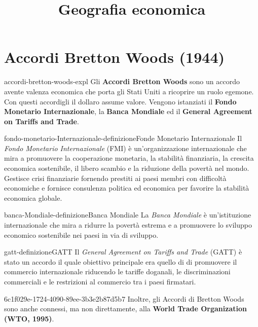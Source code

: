\documentclass[preview]{standalone}
\begin{document}
\title{Geografia economica}
\genpage

\section{Accordi Bretton Woods (1944)}

\begin{snippet}{accordi-bretton-woods-expl}
    Gli \textbf{Accordi Bretton Woods} sono un accordo avente valenza economica
    che porta gli Stati Uniti a ricoprire un ruolo egemone. Con questi accordigli il
    dollaro assume valore. Vengono istanziati il \textbf{Fondo Monetario Internazionale},
    la \textbf{Banca Mondiale} ed il \textbf{General Agreement on Tariffs and Trade}.
\end{snippet}

\begin{snippetdefinition}{fondo-monetario-Internazionale-definizione}{Fonde Monetario Internazionale}
    Il \textit{Fondo Monetario Internazionale} (FMI) è un'organizzazione internazionale che mira a promuovere
    la cooperazione monetaria, la stabilità finanziaria,
    la crescita economica sostenibile, il libero scambio e la riduzione della povertà nel mondo.
    Gestisce crisi finanziarie fornendo prestiti ai paesi membri con difficoltà economiche e
    fornisce consulenza politica ed economica per favorire la stabilità economica globale.
\end{snippetdefinition}

\begin{snippetdefinition}{banca-Mondiale-definizione}{Banca Mondiale}
    La \textit{Banca Mondiale} è un'istituzione internazionale che mira a ridurre la povertà
    estrema e a promuovere lo sviluppo economico sostenibile nei paesi in via di sviluppo.
\end{snippetdefinition}

\begin{snippetdefinition}{gatt-definizione}{GATT}
    Il \textit{General Agreement on Tariffs and Trade} (GATT)
    è stato un accordo il quale obiettivo principale era quello di
    di promuovere il commercio internazionale riducendo le tariffe doganali,
    le discriminazioni commerciali e le restrizioni al commercio tra i paesi firmatari. 
\end{snippetdefinition}

\begin{snippet}{6c1f029e-1724-4090-89ee-3b3e2b87d5b7}
    Inoltre, gli Accordi di Bretton Woods sono anche connessi, ma non direttamente,
    alla \textbf{World Trade Organization (WTO, 1995)}.
\end{snippet}
\end{document}
